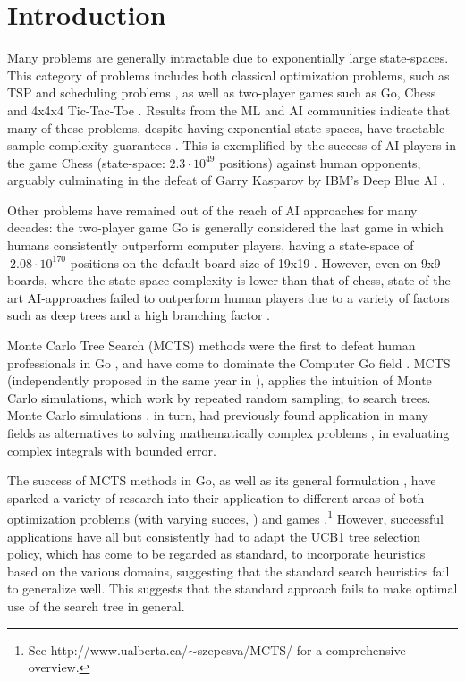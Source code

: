\section{Introduction}
Many problems are generally intractable due to exponentially large state-spaces. This category of problems includes both classical optimization problems, such as TSP and scheduling problems \cite{browne2012survey}, as well as two-player games such as Go, Chess and 4x4x4 Tic-Tac-Toe \cite{chaslot2010monte, sharma2008knowledge}.
Results from the ML and AI communities indicate that many of these problems, despite having exponential state-spaces, have tractable sample complexity guarantees \cite{sharma2008knowledge}. This is exemplified by the success of AI players in the game Chess (state-space: $2.3 \cdot 10^{49}$ positions) against human opponents, arguably culminating in the defeat of Garry Kasparov by IBM's Deep Blue AI \cite{campbell2002deep}.

Other problems have remained out of the reach of AI approaches for many decades: the two-player game Go is generally considered the last game in which humans consistently outperform computer players, having a state-space of $~2.08 \cdot 10^{170}$ positions on the default board size of 19x19 \cite{tromp2007combinatorics}. However, even on 9x9 boards, where the state-space complexity is lower than that of chess, state-of-the-art AI-approaches failed to outperform human players due to a variety of factors such as deep trees and a high branching factor \cite{browne2012survey}.

Monte Carlo Tree Search (MCTS) methods were the first to defeat human professionals in Go \cite{coulom2007efficient}, and have come to dominate the Computer Go field \cite{chaslot2010monte}. MCTS (independently proposed in the same year in \cite{coulom2007efficient, kocsis2006bandit, chaslot2006monte}), applies the intuition of Monte Carlo simulations, which work by repeated random sampling, to search trees. Monte Carlo simulations \cite{metropolis1985monte}, in turn, had previously found application in many fields as alternatives to solving mathematically complex problems \cite{liu2008monte}, \eg in evaluating complex integrals with bounded error.

The success of MCTS methods in Go, as well as its general formulation \cite{chaslot2010monte}, have sparked a variety of research into their application to different areas of both optimization problems (with varying succes, \eg \cite{rimmel2011optimization, cazenave2009monte}) and games \cite{schadd2008single, gelly2012grand}.\footnote{See http://www.ualberta.ca/$\sim$szepesva/MCTS/ for a comprehensive overview.} However, successful applications have all but consistently had to adapt the UCB1 tree selection policy, which has come to be regarded as standard, to incorporate heuristics based on the various domains, suggesting that the standard search heuristics fail to generalize well. This suggests that the standard approach fails to make optimal use of the search tree in general.

